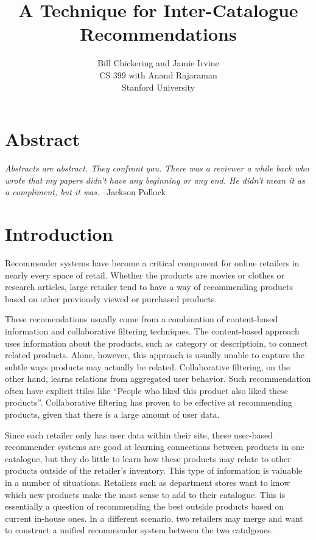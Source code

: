 \documentclass[11pt]{article}
\begin{document}

\title{A Technique for Inter-Catalogue Recommendations}
\author{Bill Chickering and Jamie Irvine\\
CS 399 with Anand Rajaraman\\
Stanford University}
\renewcommand{\today}{June 12, 2014}
\maketitle

\section*{Abstract}
\emph{Abstracts are abstract. They confront you. There was a reviewer a
while back who wrote that my papers didn't have any beginning or any end. He
didn't mean it as a compliment, but it was.} --Jackson Pollock

\section*{Introduction}
Recommender systems have become a critical component for online retailers in
nearly every space of retail. Whether the products are movies or clothes or research
articles, large retailer tend to have a way of recommending products based on
other previously viewed or purchased products.

These recomendations usually come from a combination of content-based
information and collaborative filtering techniques. The content-based approach
uses information about the products, such as category or descriptioin, to
connect related products. Alone, however, this approach is usually unable to
capture the subtle ways products may actually be related. Collaborative
filtering, on the other hand, learns relations from aggregated user behavior. 
Such recommendation often have explicit ttiles like ``People who liked 
this product also liked these products''. Collaborative filtering has proven to
be effective at recommending products, given that there is a large amount of user 
data.

Since each retailer only has user data within their site, these user-based
recommender systems are good at learning connections between products in
one catalogue, but they do little to learn how these products may relate to
other products outside of the retailer's inventory. This type of information is
valuable in a number of situations. Retailers such as department stores
want to know which new products make the most sense to add to their catalogue.
This is essentially a question of recommending the best outside products based
on current in-house ones. In a different scenario, two retailers may merge and 
want to construct a unified recommender system between the two catalgoues.
\end{document}
